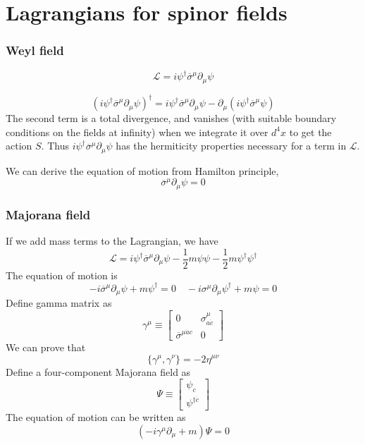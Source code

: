 \section{Lagrangians for spinor fields}
\subsubsection{Weyl field}
\[\mathcal{L} = i \psi^{\dagger} \overline{\sigma}^{\mu} \partial_{\mu} \psi \]
\begin{note}
\[(i \psi^{\dagger} \overline{\sigma}^{\mu} \partial_{\mu} \psi)^{\dagger} = i \psi^{\dagger} \overline{\sigma}^{\mu} \partial_{\mu} \psi - \partial_{\mu}(i \psi^{\dagger} \overline{\sigma}^{\mu} \psi)\]
The second term is a total divergence, and vanishes (with suitable boundary conditions on the fields at infinity) when we integrate it over $d^4 x$ to get the action $S$. Thus $i \psi^{\dagger} \overline{\sigma}^{\mu} \partial_{\mu} \psi$  has the hermiticity properties necessary for a term in $\mathcal{L}$.
\end{note}
\noindent
We can derive the equation of motion from Hamilton principle,
\[\overline{\sigma}^{\mu} \partial_{\mu} \psi = 0\]

\subsubsection{Majorana field}
If we add mass terms to the Lagrangian, we have
\[\mathcal{L} = i \psi^{\dagger} \overline{\sigma}^{\mu} \partial_{\mu} \psi - \frac{1}{2}m \psi \psi - \frac{1}{2}m \psi^{\dagger} \psi^{\dagger}\]
The equation of motion is
\[-i\overline{\sigma}^{\mu} \partial_{\mu} \psi + m \psi^{\dagger} = 0 \quad -i\sigma^{\mu} \partial_{\mu} \psi^{\dagger} + m \psi = 0 \]
Define gamma matrix as
\[\gamma^{\mu} \equiv \left[ \begin{matrix} 0& \sigma^{\mu}_{a\dot{c}}\\ \overline{\sigma}^{\mu\dot{a}c}& 0\end{matrix} \right] \]
We can prove that
\[\{\gamma^{\mu},\gamma^{\nu}\} = -2\eta^{\mu\nu}\]
Define a four-component Majorana field as
\[\Psi \equiv \left[ \begin{matrix} \psi_c \\ \psi^{\dagger \dot{c}}\end{matrix} \right] \]
The equation of motion can be written as
\[(-i\gamma^{\mu}\partial_{\mu}+m)\Psi=0\]

